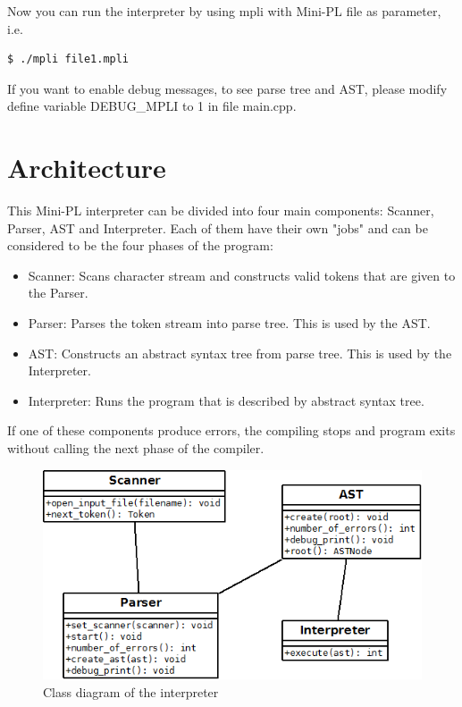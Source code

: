 \documentclass[english,11pt,twoside,a4paper]{article}
\begin{document}
Now you can run the interpreter by using mpli with Mini-PL file as parameter, i.e.

\begin{lstlisting}[language=bash]
  $ ./mpli file1.mpli
\end{lstlisting}

If you want to enable debug messages, to see parse tree and AST, please modify define variable DEBUG\_MPLI to 1 in file main.cpp.

\section{Architecture}

This Mini-PL interpreter can be divided into four main components: Scanner, Parser, AST and Interpreter. Each of them have their own "jobs" and can be considered to be the four phases of the program:

\begin{itemize}
	\item Scanner: Scans character stream and constructs valid tokens that are given to the Parser.
	\item Parser: Parses the token stream into parse tree. This is used by the AST.
	\item AST: Constructs an abstract syntax tree from parse tree. This is used by the Interpreter.
	\item Interpreter: Runs the program that is described by abstract syntax tree.
\end{itemize}

If one of these components produce errors, the compiling stops and program exits without calling the next phase of the compiler.

\begin{figure}
	\begin{center}
		\includegraphics{class_diagram.png}
		\caption{Class diagram of the interpreter}
	\end{center}
	\label{class_diagram1}
\end{figure}
\end{document}
